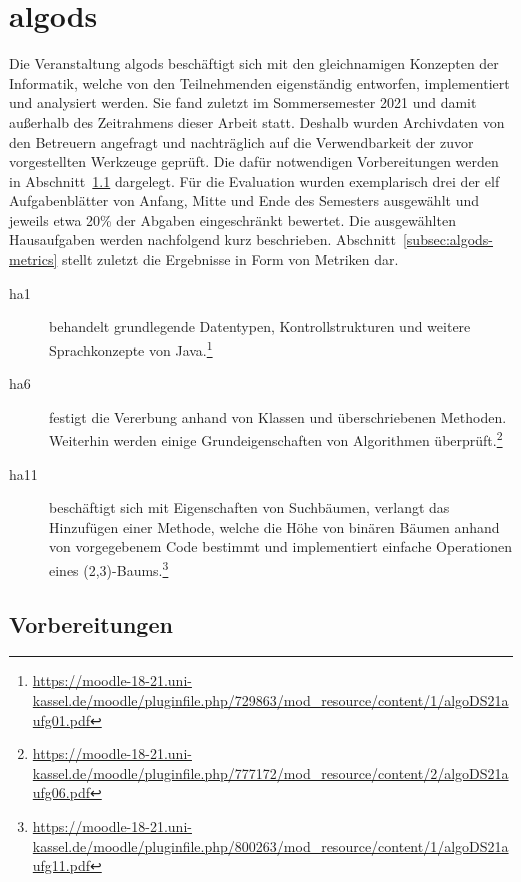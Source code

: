 \section{\acl{algods}}\label{sec:algods-2021}

Die Veranstaltung \ac{algods} beschäftigt sich mit den gleichnamigen Konzepten der Informatik, welche von den Teilnehmenden eigenständig entworfen, implementiert und analysiert werden.
Sie fand zuletzt im Sommersemester 2021 und damit außerhalb des Zeitrahmens dieser Arbeit statt.
Deshalb wurden Archivdaten von den Betreuern angefragt und nachträglich auf die Verwendbarkeit der zuvor vorgestellten Werkzeuge geprüft.
Die dafür notwendigen Vorbereitungen werden in Abschnitt~\ref{subsec:algods-preparations} dargelegt.
Für die Evaluation wurden exemplarisch drei der elf Aufgabenblätter von Anfang, Mitte und Ende des Semesters ausgewählt und jeweils etwa 20\% der Abgaben eingeschränkt bewertet.
Die ausgewählten Hausaufgaben werden nachfolgend kurz beschrieben.
Abschnitt~\ref{subsec:algods-metrics} stellt zuletzt die Ergebnisse in Form von Metriken dar.

\begin{description}
    \item[\ac{ha}1] behandelt grundlegende Datentypen, Kontrollstrukturen und weitere Sprachkonzepte von Java.\footnote{
        \url{https://moodle-18-21.uni-kassel.de/moodle/pluginfile.php/729863/mod_resource/content/1/algoDS21aufg01.pdf}
    }
    \item[\ac{ha}6] festigt die Vererbung anhand von Klassen und überschriebenen Methoden.
    Weiterhin werden einige Grundeigenschaften von Algorithmen überprüft.\footnote{
        \url{https://moodle-18-21.uni-kassel.de/moodle/pluginfile.php/777172/mod_resource/content/2/algoDS21aufg06.pdf}
    }
    \item[\ac{ha}11] beschäftigt sich mit Eigenschaften von Suchbäumen, verlangt das Hinzufügen einer Methode, welche die Höhe von binären Bäumen anhand von vorgegebenem Code bestimmt und implementiert einfache Operationen eines (2,3)-Baums.\footnote{
        \url{https://moodle-18-21.uni-kassel.de/moodle/pluginfile.php/800263/mod_resource/content/1/algoDS21aufg11.pdf}
    }
\end{description}

\subsection{Vorbereitungen}\label{subsec:algods-preparations}

